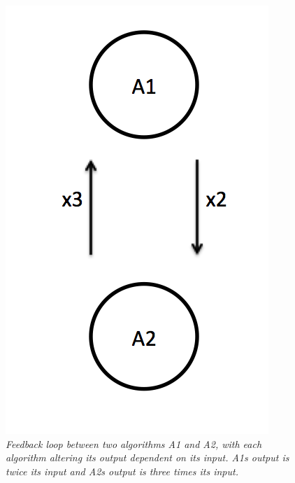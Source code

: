 \documentclass{article}
\begin{document}
\begin{figure}[H]
	\centering
	\includegraphics[scale=0.5]{simpletwofbex}
	\caption{\it Feedback loop between two algorithms A1 and A2, with each algorithm altering its output dependent on its input. A1s output is twice its input and A2s output is three times its input.}
	\label{fig:examplesimpletwofeedback}
\end{figure} 
\end{document}
